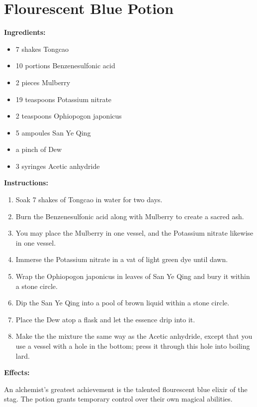\documentclass{article}
\begin{document}
\newpage
\section*{Flourescent Blue Potion}

\textbf{Ingredients:}

\begin{itemize}
  \item 7 shakes Tongcao
  \item 10 portions Benzenesulfonic acid
  \item 2 pieces Mulberry
  \item 19 teaspoons Potassium nitrate
  \item 2 teaspoons Ophiopogon japonicus
  \item 5 ampoules San Ye Qing
  \item a pinch of Dew
  \item 3 syringes Acetic anhydride
\end{itemize}

\textbf{Instructions:}

\begin{enumerate}
  \item Soak 7 shakes of Tongcao in water for two days.
  \item Burn the Benzenesulfonic acid along with Mulberry to create a sacred ash.
  \item You may place the Mulberry in one vessel, and the Potassium nitrate likewise in one vessel.
  \item Immerse the Potassium nitrate in a vat of light green dye until dawn.
  \item Wrap the Ophiopogon japonicus in leaves of San Ye Qing and bury it within a stone circle.
  \item Dip the San Ye Qing into a pool of brown liquid within a stone circle.
  \item Place the Dew atop a flask and let the essence drip into it.
  \item Make the the mixture the same way as the Acetic anhydride, except that you use a vessel with a hole in the bottom; press it through this hole into boiling lard.
\end{enumerate}

\textbf{Effects:}

An alchemist's greatest achievement is the talented flourescent blue elixir of the stag. The potion grants temporary control over their own magical abilities.
\end{document}
